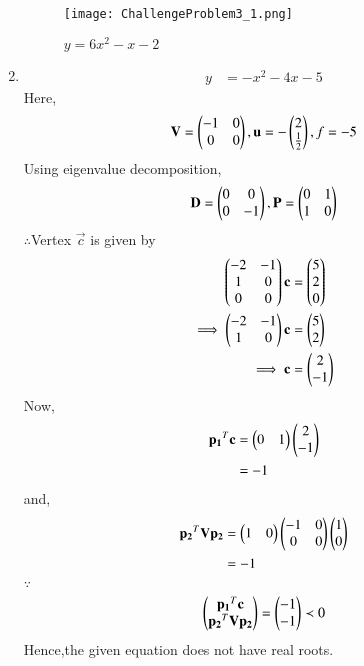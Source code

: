 \documentclass[journal,12pt,twocolumn]{IEEEtran}
\begin{document}
\begin{enumerate}
    \begin{figure}[!ht]
    \centering
    \texttt{[image: ChallengeProblem3\_1.png]}
    \caption{$y=6x^2-x-2$}
    \label{ex2}	
    \end{figure}
    
    \item
    \begin{align}
        y &= -x^2-4x-5
    \end{align}
    Here,
    \begin{align}
        \mathbf{V} = \begin{pmatrix}-1 & 0 \\ 0 & 0\end{pmatrix},\mathbf{u}=-\begin{pmatrix}2 \\ \frac{1}{2}\end{pmatrix},f=-5
    \end{align}
    Using eigenvalue decomposition,
    \begin{align}
        \mathbf{D} = \begin{pmatrix}0 & 0\\0 & -1\end{pmatrix} ,\mathbf{P}=\begin{pmatrix}0 & 1\\1 & 0\end{pmatrix}
    \end{align}
    $\therefore$Vertex $\vec{c}$ is given by
    \begin{align}
        \begin{pmatrix}-2 & -1 \\ 1 & 0 \\ 0 & 0\end{pmatrix}\mathbf{c} &= \begin{pmatrix}5 \\ 2 \\ 0\end{pmatrix} \\
        \implies  \begin{pmatrix}-2 & -1 \\ 1 & 0\end{pmatrix}\mathbf{c} &= \begin{pmatrix}5 \\ 2\end{pmatrix}
        \\
        \implies \mathbf{c} &= \begin{pmatrix}2\\-1\end{pmatrix}
    \end{align}
    Now,
    \begin{align}
        \mathbf{p_1}^T\mathbf{c} &= \begin{pmatrix}0 & 1\end{pmatrix}\begin{pmatrix}2 \\ -1\end{pmatrix}
        \\
        &= -1
    \end{align}
    and,
    \begin{align}
        \mathbf{p_2}^T\mathbf{V}\mathbf{p_2} &= \begin{pmatrix}1 & 0\end{pmatrix}\begin{pmatrix}-1 & 0\\0& 0\end{pmatrix}\begin{pmatrix}1 \\ 0\end{pmatrix}
        \\
        &= -1
    \end{align}
    $\because$
    \begin{align}
    \begin{pmatrix}\mathbf{p_1}^T\mathbf{c} \\ \mathbf{p_2}^T\mathbf{V}\mathbf{p_2}\end{pmatrix} = \begin{pmatrix}-1 \\ -1\end{pmatrix} \prec 0
    \end{align}
    Hence,the given equation does not have real roots.
    

\end{enumerate}
\end{document}
